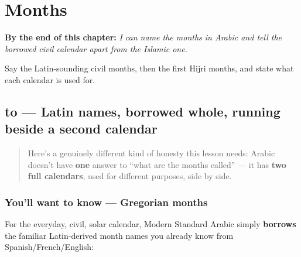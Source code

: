 
\chapter{Months}
\label{ch:ar-months}

\begin{chapteropening}
\textbf{By the end of this chapter:} \emph{I can name the months in Arabic and tell the borrowed civil calendar apart from the Islamic one.}

Say the Latin-sounding civil months, then the first Hijri months, and state what each calendar is used for.
\end{chapteropening}

\section[\texorpdfstring{\ar{يناير} \ar{فبراير} … (yanāyir fabrāyir …)}{يناير فبراير … (yanāyir fabrāyir …)}]{ to  — Latin names, borrowed whole, running beside a second calendar}

\label{lesson:AR-C14-ashhur}



\begin{quote}
Here's a genuinely different kind of honesty this lesson needs: Arabic doesn't have \textbf{one} answer to \textquotedblleft{}what are the months called\textquotedblright{} — it has \textbf{two full calendars}, used for different purposes, side by side.
\end{quote}

\subsection*{You'll want to know — Gregorian months}
For the everyday, civil, solar calendar, Modern Standard Arabic simply \textbf{borrows} the familiar Latin-derived month names you already know from Spanish/French/English:

